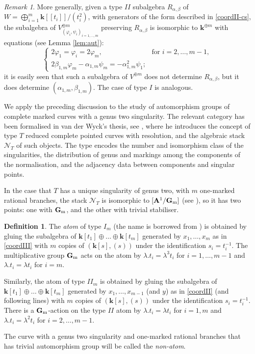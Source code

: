 \documentclass{compositio}
\renewcommand{\k}{\mathbf k}
\newcommand{\Aaff}{\mathbb A}
\newcommand{\Gm}{\mathbb{G}_{\rm{m}}}
\theoremstyle{plain}
\theoremstyle{definition}
\newtheorem{definition}[thm]{Definition}
\theoremstyle{remark}
\newtheorem{rem}[thm]{Remark}
\begin{document}
\begin{rem}
 More generally, given a type $I\!I$ subalgebra $R_{\alpha,\beta}$ of $W=\bigoplus_{i=1}^m\k[\![t_i]\!]/(t_i^2)$, with generators of the form described in \eqref{coordII-cs}, the subalgebra of $V^{\oplus m}_{(\varphi_i,\psi_i)_{i=1,\ldots,m}}$ preserving $R_{\alpha,\beta}$ is isomorphic to $\k^{\oplus m}$ with equations (see Lemma \ref{lem:aut}):
 \[\begin{cases} 2\varphi_1=\varphi_i=2\varphi_m, & \text{for } i=2,\ldots,m-1,\\ 2\beta_{1,m}\varphi_m-\alpha_{1,m}\psi_m=-\alpha_{1,m}^2\psi_1;\end{cases}\]
 it is easily seen that such a subalgebra of $V^{\oplus m}$ does not determine $R_{\alpha,\beta}$, but it does determine $(\alpha_{1,m},\beta_{1,m})$. The case of type $I$ is analogous.
\end{rem}

We apply the preceding discussion to the study of automorphism groups of complete marked curves with a genus two singularity. The relevant category has been formalised in van der Wyck's thesis, see \cite[Proposition 1.102, Theorem 1.105 and Corollary 1.106]{vdW}, where he introduces the concept of type $T$ reduced complete pointed curves with resolution, and the algebraic stack $\mathcal N_T$ of such objects. The type encodes the number and isomorphism class of the singularities, the distribution of genus and markings among the components of the normalisation, and the adjacency data between components and singular points. 

In the case that $T$ has a unique singularity of genus two, with $m$ one-marked rational branches, the stack $\mathcal N_T$ is isomorphic to $[\Aaff^1/\Gm]$ (see \cite[Examples 1.111-112]{vdW}), so it has two points: one with $\Gm$, and the other with trivial stabiliser.

\begin{definition}
 The \emph{atom} of type $I_m$ (the name is borrowed from \cite{AFS1}) is obtained by gluing the subalgebra of $\k[t_1]\oplus\ldots\oplus\k[t_m]$ generated by $x_1,\ldots,x_m$ as in \eqref{coordIII} with $m$ copies of $(\k[s],(s))$ under the identification $s_i=t_i^{-1}$. The multiplicative group $\Gm$ acts on the  atom by $\lambda.t_i=\lambda^3 t_i$ for $i=1,\ldots,m-1$ and $\lambda.t_i=\lambda t_i$ for $i=m$.
 
 Similarly, the atom of type $I\!I_m$ is obtained by gluing the subalgebra of $\k[t_1]\oplus\ldots\oplus\k[t_m]$ generated by $x_1,\ldots,x_{m-1}$ (and $y$) as in \eqref{coordII} (and following lines) with $m$ copies of $(\k[s],(s))$ under the identification $s_i=t_i^{-1}$. There is a $\Gm$-action on the type $I\!I$ atom by $\lambda.t_i=\lambda t_i$ for $i=1,m$ and $\lambda.t_i=\lambda^2 t_i$ for $i=2,\ldots,m-1$.
 
 The curve with a genus two singularity and one-marked rational branches that has trivial automorphism group will be called the \emph{non-atom}.
\end{definition}
\end{document}
